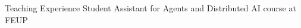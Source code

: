 
\begin{rubric}{Teaching Experience}
		Student Assistant for Agents and Distributed AI course at FEUP
\end{rubric}
